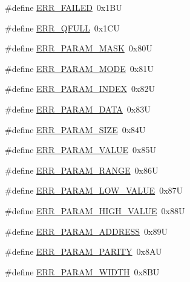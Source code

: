 \begin{DoxyCompactItemize}
\#define \hyperlink{group___p_e___error__module_gada2a13c14425d327be8414733c7e4a56}{E\+R\+R\+\_\+\+F\+A\+I\+L\+E\+D}~0x1\+B\+U
\item 
\#define \hyperlink{group___p_e___error__module_gad65300b536c4165d469701d5db712cd0}{E\+R\+R\+\_\+\+Q\+F\+U\+L\+L}~0x1\+C\+U
\item 
\#define \hyperlink{group___p_e___error__module_ga970a8c8e887512534203a47758618763}{E\+R\+R\+\_\+\+P\+A\+R\+A\+M\+\_\+\+M\+A\+S\+K}~0x80\+U
\item 
\#define \hyperlink{group___p_e___error__module_ga82c14ce7730e53556eebd8522e60f7a9}{E\+R\+R\+\_\+\+P\+A\+R\+A\+M\+\_\+\+M\+O\+D\+E}~0x81\+U
\item 
\#define \hyperlink{group___p_e___error__module_ga62fe765f9a9f81fab7fda1c66f798460}{E\+R\+R\+\_\+\+P\+A\+R\+A\+M\+\_\+\+I\+N\+D\+E\+X}~0x82\+U
\item 
\#define \hyperlink{group___p_e___error__module_gaeb2f60cce36e220acadb18ae558d7fe6}{E\+R\+R\+\_\+\+P\+A\+R\+A\+M\+\_\+\+D\+A\+T\+A}~0x83\+U
\item 
\#define \hyperlink{group___p_e___error__module_ga28178b0019131081a20e071b469f8154}{E\+R\+R\+\_\+\+P\+A\+R\+A\+M\+\_\+\+S\+I\+Z\+E}~0x84\+U
\item 
\#define \hyperlink{group___p_e___error__module_gab1b9c8e3380ec0d179ca12c15376e87a}{E\+R\+R\+\_\+\+P\+A\+R\+A\+M\+\_\+\+V\+A\+L\+U\+E}~0x85\+U
\item 
\#define \hyperlink{group___p_e___error__module_ga41549ae34f9b04ae4999ea6d409e37cd}{E\+R\+R\+\_\+\+P\+A\+R\+A\+M\+\_\+\+R\+A\+N\+G\+E}~0x86\+U
\item 
\#define \hyperlink{group___p_e___error__module_gabc89752a87a9f53f321fbab8d09a8ede}{E\+R\+R\+\_\+\+P\+A\+R\+A\+M\+\_\+\+L\+O\+W\+\_\+\+V\+A\+L\+U\+E}~0x87\+U
\item 
\#define \hyperlink{group___p_e___error__module_ga9229f7ed87a3c19d767a531f64878de4}{E\+R\+R\+\_\+\+P\+A\+R\+A\+M\+\_\+\+H\+I\+G\+H\+\_\+\+V\+A\+L\+U\+E}~0x88\+U
\item 
\#define \hyperlink{group___p_e___error__module_ga74cd838ca304eac3802e330625e40eaf}{E\+R\+R\+\_\+\+P\+A\+R\+A\+M\+\_\+\+A\+D\+D\+R\+E\+S\+S}~0x89\+U
\item 
\#define \hyperlink{group___p_e___error__module_ga00e4ff0963dd709271c3ec8a56bf5611}{E\+R\+R\+\_\+\+P\+A\+R\+A\+M\+\_\+\+P\+A\+R\+I\+T\+Y}~0x8\+A\+U
\item 
\#define \hyperlink{group___p_e___error__module_ga11fd34b18ad64242e823cd535b660d66}{E\+R\+R\+\_\+\+P\+A\+R\+A\+M\+\_\+\+W\+I\+D\+T\+H}~0x8\+B\+U

\end{DoxyCompactItemize}
